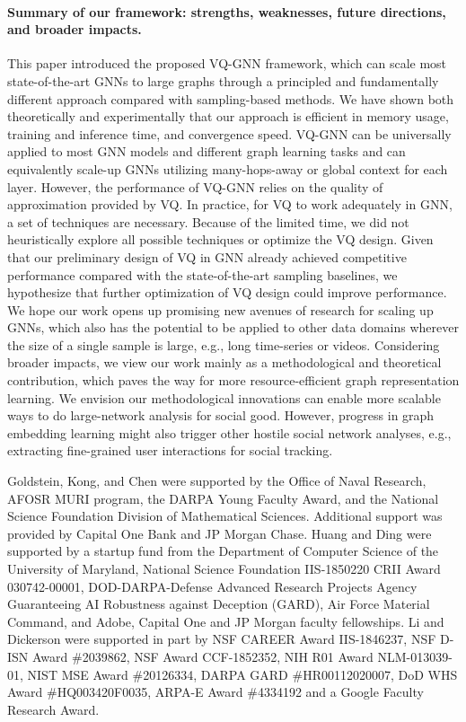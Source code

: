 \documentclass{article}
\newcommand{\cm}{\paragraph}
\begin{document}
\cm{Summary of our framework: strengths, weaknesses, future directions, and broader impacts.}
This paper introduced the proposed VQ-GNN framework, which can scale most state-of-the-art GNNs to large graphs through a principled and fundamentally different approach compared with sampling-based methods. We have shown both theoretically and experimentally that our approach is efficient in memory usage, training and inference time, and convergence speed. VQ-GNN can be universally applied to most GNN models and different graph learning tasks and can equivalently scale-up GNNs utilizing many-hops-away or global context for each layer. However, the performance of VQ-GNN relies on the quality of approximation provided by VQ. In practice, for VQ to work adequately in GNN, a set of techniques are necessary. Because of the limited time, we did not heuristically explore all possible techniques or optimize the VQ design. Given that our preliminary design of VQ in GNN already achieved competitive performance compared with the state-of-the-art sampling baselines, we hypothesize that further optimization of VQ design could improve performance. We hope our work opens up promising new avenues of research for scaling up GNNs, which also has the potential to be applied to other data domains wherever the size of a single sample is large, e.g., long time-series or videos. Considering broader impacts, we view our work mainly as a methodological and theoretical contribution, which paves the way for more resource-efficient graph representation learning. We envision our methodological innovations can enable more scalable ways to do large-network analysis for social good. However, progress in graph embedding learning might also trigger other hostile social network analyses, e.g., extracting fine-grained user interactions for social tracking.

%
 


\begin{ack}

Goldstein, Kong, and Chen were supported by the Office of Naval Research, AFOSR MURI program, the DARPA Young Faculty Award, and the National Science Foundation Division of Mathematical Sciences. Additional support was provided by Capital One Bank and JP Morgan Chase. Huang and Ding were supported by a startup fund from the Department of Computer Science of the University of Maryland, National Science Foundation IIS-1850220 CRII Award 030742-00001, DOD-DARPA-Defense Advanced Research Projects Agency Guaranteeing AI Robustness against Deception (GARD), Air Force Material Command, and Adobe, Capital One and JP Morgan faculty fellowships. Li and Dickerson were supported in part by NSF CAREER Award IIS-1846237, NSF D-ISN Award \#2039862, NSF Award CCF-1852352, NIH R01 Award NLM-013039-01, NIST MSE Award \#20126334, DARPA GARD \#HR00112020007, DoD WHS Award \#HQ003420F0035, ARPA-E Award \#4334192 and a Google Faculty Research Award.



\end{ack}
\end{document}
